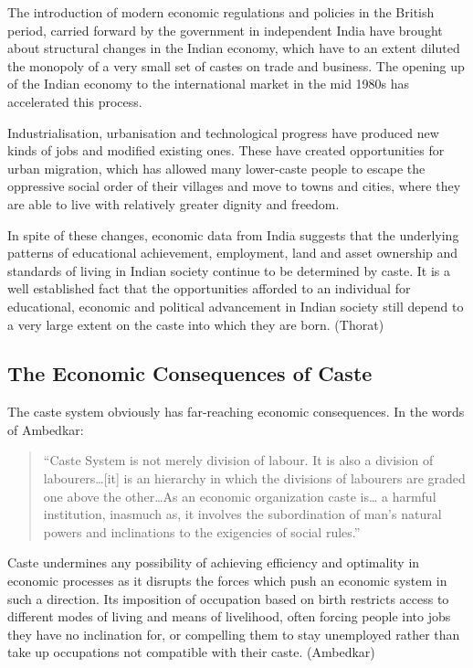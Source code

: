 \documentclass[12pt,a4paper,titlepage]{report}
\begin{document}
The introduction of modern economic regulations and policies in the
British period, carried forward by the government in independent India
have brought about structural changes in the Indian economy, which have
to an extent diluted the monopoly of a very small set of castes on trade
and business. The opening up of the Indian economy to the international
market in the mid 1980s has accelerated this process.

Industrialisation, urbanisation and technological progress have produced
new kinds of jobs and modified existing ones. These have created
opportunities for urban migration, which has allowed many lower-caste
people to escape the oppressive social order of their villages and move
to towns and cities, where they are able to live with relatively greater
dignity and freedom.

In spite of these changes, economic data from India suggests that the
underlying patterns of educational achievement, employment, land and
asset ownership and standards of living in Indian society continue to be
determined by caste. It is a well established fact that the
opportunities afforded to an individual for educational, economic and
political advancement in Indian society still depend to a very large
extent on the caste into which they are born. (Thorat)

\subsection{The Economic Consequences of
Caste}\label{the-economic-consequences-of-caste}

The caste system obviously has far-reaching economic consequences. In
the words of Ambedkar:

\begin{quote}
``Caste System is not merely division of labour. It is also a division
of labourers\ldots{}{[}it{]} is an hierarchy in which the divisions of
labourers are graded one above the other\ldots{}As an economic
organization caste is\ldots{} a harmful institution, inasmuch as, it
involves the subordination of man's natural powers and inclinations to
the exigencies of social rules.''
\end{quote}

Caste undermines any possibility of achieving efficiency and optimality
in economic processes as it disrupts the forces which push an economic
system in such a direction. Its imposition of occupation based on birth
restricts access to different modes of living and means of livelihood,
often forcing people into jobs they have no inclination for, or
compelling them to stay unemployed rather than take up occupations not
compatible with their caste. (Ambedkar)
\end{document}
